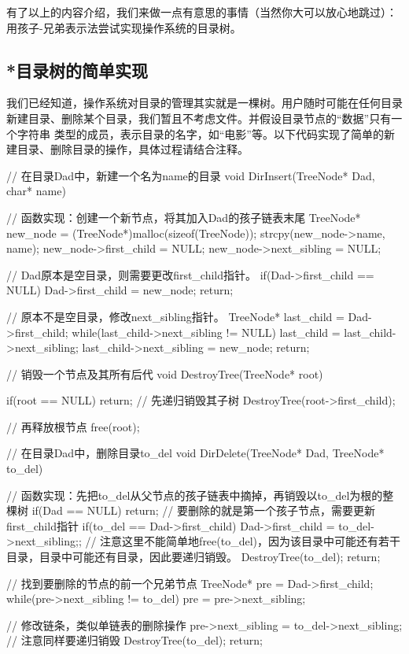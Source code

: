 有了以上的内容介绍，我们来做一点有意思的事情（当然你大可以放心地跳过）：用孩子-兄弟表示法尝试实现操作系统的目录树。

\subsection{*目录树的简单实现}
我们已经知道，操作系统对目录的管理其实就是一棵树。用户随时可能在任何目录新建目录、删除某个目录，我们暂且不考虑文件。并假设目录节点的“数据”只有一个字符串
类型的成员，表示目录的名字，如“电影”等。以下代码实现了简单的新建目录、删除目录的操作，具体过程请结合注释。

\begin{cppcode}
    // 在目录Dad中，新建一个名为name的目录
    void DirInsert(TreeNode* Dad, char* name) {
        // 函数实现：创建一个新节点，将其加入Dad的孩子链表末尾
        TreeNode* new_node = (TreeNode*)malloc(sizeof(TreeNode));
        strcpy(new_node->name, name);
        new_node->first_child = NULL;
        new_node->next_sibling = NULL;

        // Dad原本是空目录，则需要更改first_child指针。
        if(Dad->first_child == NULL) {
            Dad->first_child = new_node;
            return;
        }

        // 原本不是空目录，修改next_sibling指针。
        TreeNode* last_child = Dad->first_child;
        while(last_child->next_sibling != NULL) {
            last_child = last_child->next_sibling;
        }
        last_child->next_sibling = new_node;
        return;
    }

    // 销毁一个节点及其所有后代
    void DestroyTree(TreeNode* root) {
        if(root == NULL) return;
        // 先递归销毁其子树
        DestroyTree(root->first_child);

        // 再释放根节点
        free(root);
    }

    // 在目录Dad中，删除目录to_del
    void DirDelete(TreeNode* Dad, TreeNode* to_del) {
        // 函数实现：先把to_del从父节点的孩子链表中摘掉，再销毁以to_del为根的整棵树
        if(Dad == NULL) {
            return;
        }
        // 要删除的就是第一个孩子节点，需要更新first_child指针
        if(to_del == Dad->first_child) {
            Dad->first_child = to_del->next_sibling;;
            // 注意这里不能简单地free(to_del)，因为该目录中可能还有若干目录，目录中可能还有目录，因此要递归销毁。
            DestroyTree(to_del);
            return;
        }

        // 找到要删除的节点的前一个兄弟节点
        TreeNode* pre = Dad->first_child;
        while(pre->next_sibling != to_del) {
            pre = pre->next_sibling;
        }

        // 修改链条，类似单链表的删除操作
        pre->next_sibling = to_del->next_sibling;
        // 注意同样要递归销毁
        DestroyTree(to_del);
        return;
    }
\end{cppcode}

